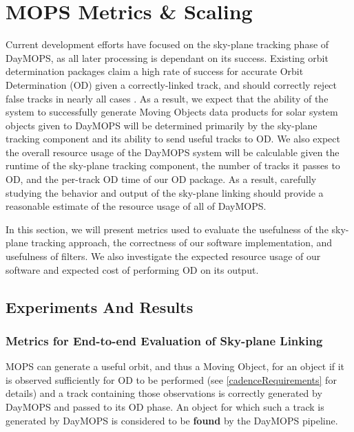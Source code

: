 \documentclass[12pt,preprint]{aastex}
\begin{document}
\section{MOPS Metrics \& Scaling}

Current development efforts have focused on the sky-plane tracking
phase of DayMOPS, as all later processing is dependant on its
success. Existing orbit determination packages claim a high rate of
success for accurate Orbit Determination (OD) given a correctly-linked
track, and should correctly reject false tracks in nearly all cases
\citep{Milani2006}. As a result, we expect that the ability of the
system to successfully generate Moving Objects data products for solar
system objects given to DayMOPS will be determined primarily by the
sky-plane tracking component and its ability to send useful tracks to
OD.  We also expect the overall resource usage of the DayMOPS system
will be calculable given the runtime of the sky-plane tracking
component, the number of tracks it passes to OD, and the per-track OD
time of our OD package.  As a result, carefully studying the behavior
and output of the sky-plane linking should provide a reasonable
estimate of the resource usage of all of DayMOPS.


In this section, we will present metrics used to evaluate the
usefulness of the sky-plane tracking approach, the correctness of our
software implementation, and usefulness of filters. We also
investigate the expected resource usage of our software and expected cost
of performing OD on its output.



\subsection{Experiments And Results}

\subsubsection{Metrics for End-to-end Evaluation of Sky-plane Linking}
MOPS can generate a useful orbit, and thus a Moving Object, for an
object if it is observed sufficiently for OD to be performed (see
\ref{cadenceRequirements} for details) and a track containing those
observations is correctly generated by DayMOPS and passed to its OD
phase.  An object for which such a track is generated by DayMOPS is
considered to be \textbf{found} by the DayMOPS pipeline.  
\end{document}
